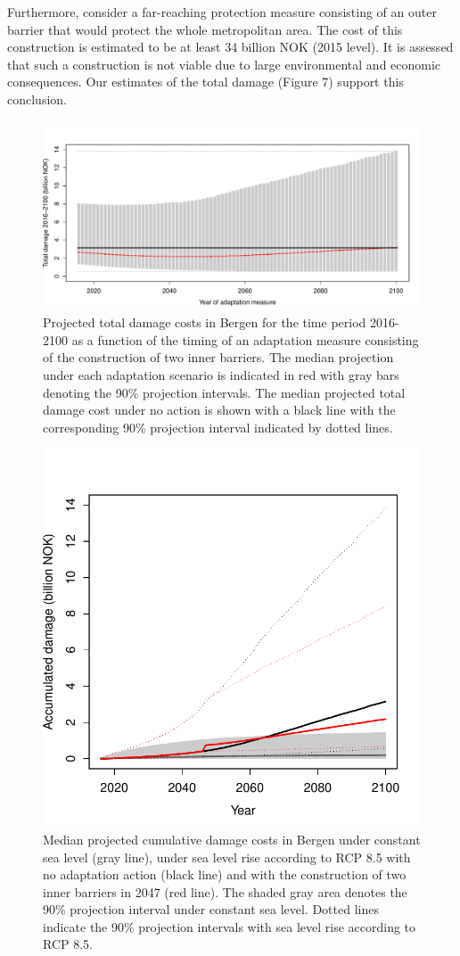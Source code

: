 \documentclass[note,screen,british,11pt]{nrdoc}
\begin{document}
Furthermore, \citet{bergenreport} consider a far-reaching protection measure consisting of an outer barrier that would protect the whole metropolitan area. The cost of this construction is estimated to be at least 34 billion NOK (2015 level). It is assessed that such a construction is not viable due to large environmental and economic consequences. Our estimates of the total damage (Figure 7) support this conclusion.  

\begin{figure}[!hbpt]
\begin{center}
\includegraphics[width=\linewidth]{TotalDamageCostsAdaptation.pdf}
\caption{Projected total damage costs in Bergen for the time period 2016-2100 as a function of the timing of an adaptation measure consisting of the construction of two inner barriers. The median projection under each adaptation scenario is indicated in red with gray bars denoting the 90\% projection intervals. The median projected total damage cost under no action is shown with a black line with the corresponding 90\% projection interval indicated by dotted lines. }  
\label{fig:TotalDamageBergen}
\end{center}
\end{figure}

\begin{figure}[!hbpt]
\begin{center}
\includegraphics[width=0.5\linewidth]{CumDamageCostsBergen.pdf}
\caption{Median projected cumulative damage costs in Bergen under constant sea level (gray line), under sea level rise according to RCP 8.5 with no adaptation action (black line) and with the construction of two inner barriers in 2047 (red line). The shaded gray area denotes the 90\% projection interval under constant sea level. Dotted lines indicate the 90\% projection intervals with sea level rise according to RCP 8.5. }
\label{fig:NoAction}
\end{center}
\end{figure}
\end{document}
